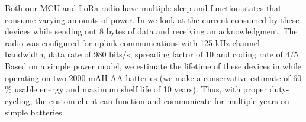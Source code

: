 



Both our MCU and LoRa radio have multiple sleep and function states that consume varying amounts of power. In  we look at the current consumed by these devices while sending out 8 bytes of data and receiving an acknowledgment. The radio was configured for uplink communications with 125 kHz channel bandwidth, data rate of 980 bits/s, spreading factor of 10 and coding rate of $4/5$.  Based on a simple power model, we estimate the lifetime of these devices in  while operating on two 2000 mAH AA batteries (we make a conservative estimate of 60 \% usable energy and maximum shelf life of 10 years). Thus, with proper duty-cycling, the custom client can function and communicate for multiple years on simple batteries.















